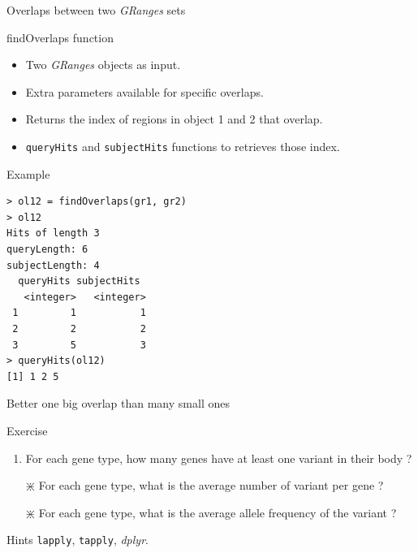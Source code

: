 \documentclass[10pt]{beamer}
\begin{document}
\begin{frame}[fragile, shrink=10]{Overlaps between two {\it GRanges} sets}
  \begin{block}{{\sf findOverlaps} function}
    \begin{itemize}
    \item Two {\it GRanges} objects as input.
    \item Extra parameters available for specific overlaps.
    \item Returns the index of regions in object 1 and 2 that overlap.
    \item \verb!queryHits! and \verb!subjectHits! functions to retrieves those index.
    \end{itemize}
  \end{block}
  \begin{exampleblock}{Example}
\begin{lstlisting}
> ol12 = findOverlaps(gr1, gr2)
> ol12
Hits of length 3
queryLength: 6
subjectLength: 4
  queryHits subjectHits
   <integer>   <integer>
 1         1           1
 2         2           2
 3         5           3
> queryHits(ol12)
[1] 1 2 5
\end{lstlisting}
  \end{exampleblock}

\end{frame}

\begin{frame}[fragile]{Better one big overlap than many small ones}
  \begin{alertblock}{Exercise}
    \begin{enumerate}
    \item For each gene type, how many genes have at least one variant in their body ?
    \item[$\divideontimes$] For each gene type, what is the average number of variant per gene ?
    \item[$\divideontimes$] For each gene type, what is the average allele frequency of the variant ?
    \end{enumerate}
  \end{alertblock}

  \begin{block}{Hints}
    \verb!lapply!, \verb!tapply!, {\it dplyr}.
  \end{block}
\end{frame}
\end{document}
